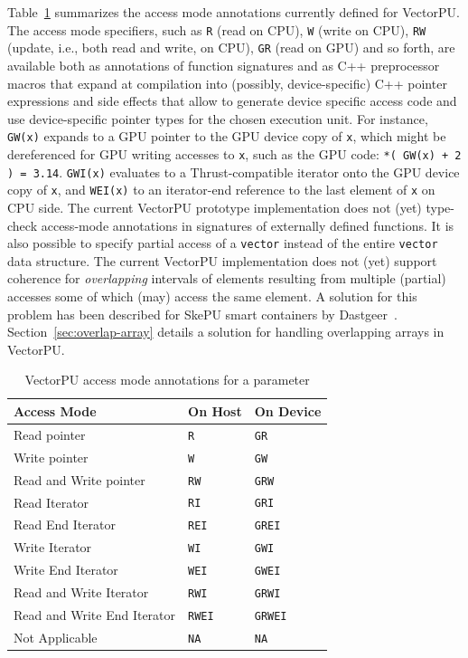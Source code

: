 Table~\ref{tab:modes} summarizes the access mode annotations
currently defined for VectorPU. The access mode specifiers,
such as \texttt{R} (read on CPU), \texttt{W} (write on CPU), \texttt{RW} 
(update, i.e., both read and write, on CPU), \texttt{GR} (read on GPU) and so forth,
are available both as annotations of function signatures and
as C++ preprocessor macros that expand at compilation into (possibly, device-specific) C++ pointer
expressions and side effects that allow to generate device specific access code
and use device-specific pointer types for the chosen execution unit. 
For instance, \texttt{GW(x)} expands to a GPU pointer to
the GPU device copy of \texttt{x},
which might be dereferenced for GPU writing accesses to \texttt{x},
such as the GPU code: \verb:*( GW(x) + 2 ) = 3.14:.
\texttt{GWI(x)} evaluates to a Thrust-compatible iterator onto the 
GPU device copy of \texttt{x}, and \texttt{WEI(x)} to an iterator-end reference
to the last element of \texttt{x} on CPU side. The current VectorPU prototype implementation does not
(yet) type-check access-mode annotations in signatures of externally defined functions.
%
It is also possible to specify partial access of a \verb:vector:
instead of the
entire \verb.vector. data structure. The current
VectorPU implementation does not (yet) support coherence for 
\emph{overlapping}
intervals of elements resulting from multiple (partial) accesses
some of which (may) access the same element.
A solution for this problem has been described for SkePU
smart containers by Dastgeer~\cite{Dastgeer-IJPP15}. Section~\ref{sec:overlap-array} details a solution for handling overlapping arrays in VectorPU.
%


\begin{table}
\caption{\label{tab:modes}VectorPU access mode annotations for a parameter  \cite{VectorPU-2017}}

\begin{center}
\begin{tabular}{|lll|}
\hline
Access Mode & On Host & On Device \\
\hline
Read pointer & \texttt{R} & \texttt{GR} \\
Write pointer & \texttt{W} & \texttt{GW} \\
Read and Write pointer & \texttt{RW} & \texttt{GRW} \\
Read Iterator & \texttt{RI} & \texttt{GRI} \\
Read End Iterator & \texttt{REI} & \texttt{GREI}\\
Write Iterator & \texttt{WI} & \texttt{GWI}\\
Write End Iterator & \texttt{WEI} & \texttt{GWEI}\\
Read and Write Iterator & \texttt{RWI} & \texttt{GRWI}\\
Read and Write End Iterator & \texttt{RWEI} & \texttt{GRWEI}\\
Not Applicable & \texttt{NA} & \texttt{NA} \\
\hline
\end{tabular}
\vspace{-3ex}
\end{center}
\end{table}


